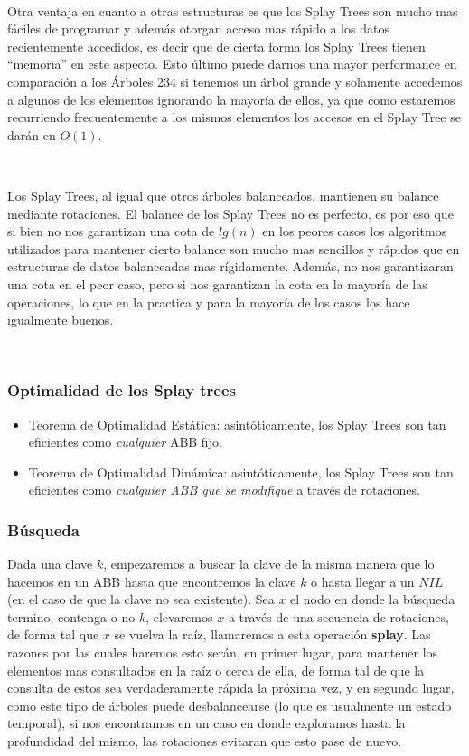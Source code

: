 ~

Otra ventaja en cuanto a otras estructuras es que los Splay Trees son mucho mas f\'aciles de programar y adem\'as otorgan acceso mas r\'apido a los datos recientemente accedidos, es decir que de cierta forma los Splay Trees tienen ``memoria'' en este aspecto. Esto \'ultimo puede darnos una mayor performance en comparaci\'on a los \'Arboles 234 si tenemos un \'arbol grande y solamente accedemos a algunos de los elementos ignorando la mayor\'ia de ellos, ya que como estaremos recurriendo frecuentemente a los mismos elementos los accesos en el Splay Tree se dar\'an en $O(1)$.

~

Los Splay Trees, al igual que otros \'arboles balanceados, mantienen su balance mediante rotaciones. El balance de los Splay Trees no es perfecto, es por eso que si bien no nos garantizan una cota de $lg(n)$ en los peores casos los algoritmos utilizados para mantener cierto balance son mucho mas sencillos y r\'apidos que en estructuras de datos balanceadas mas r\'igidamente. Adem\'as, no nos garantizaran una cota en el peor caso, pero si nos garantizan la cota en la mayor\'ia de las operaciones, lo que en la practica y para la mayor\'ia de los casos los hace igualmente buenos.

~

\subsubsection{Optimalidad de los Splay trees}
\begin{itemize}
 \item Teorema de Optimalidad Est\'atica: asint\'oticamente, los Splay Trees son tan eficientes como \textit{cualquier} ABB fijo.
 \item Teorema de Optimalidad Din\'amica: asint\'oticamente, los Splay Trees son tan eficientes como \textit{cualquier ABB que se modifique} a trav\'es de rotaciones.
\end{itemize}


\subsubsection{B\'usqueda}

Dada una clave $k$, empezaremos a buscar la clave de la misma manera que lo hacemos en un ABB hasta que encontremos la clave $k$ o hasta llegar a un $NIL$ (en el caso de que la clave no sea existente). Sea $x$ el nodo en donde la b\'usqueda termino, contenga o no $k$, elevaremos $x$ a trav\'es de una secuencia de rotaciones, de forma tal que $x$ se vuelva la ra\'iz, llamaremos a esta operaci\'on \textbf{splay}. Las razones por las cuales haremos esto ser\'an, en primer lugar, para mantener los elementos mas consultados en la ra\'iz o cerca de ella, de forma tal de que la consulta de estos sea verdaderamente r\'apida la pr\'oxima vez, y en segundo lugar, como este tipo de \'arboles puede desbalancearse (lo que es usualmente un estado temporal), si nos encontramos en un caso en donde exploramos hasta la profundidad del mismo, las rotaciones evitaran que esto pase de nuevo.

